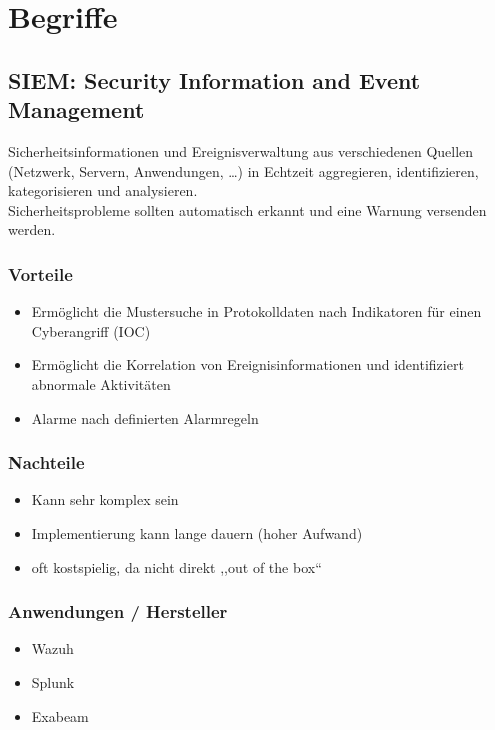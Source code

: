 

\section{Begriffe}\label{sec:Begriffe}

\subsection{SIEM: Security Information and Event Management}\label{subsec:siem}
Sicherheitsinformationen und Ereignisverwaltung aus verschiedenen Quellen (Netzwerk, Servern, Anwendungen, \ldots) in Echtzeit aggregieren, identifizieren, kategorisieren und analysieren.\\
Sicherheitsprobleme sollten automatisch erkannt und eine Warnung versenden werden.
\subsubsection{Vorteile}
\begin{itemize}
    \item Ermöglicht die Mustersuche in Protokolldaten nach Indikatoren für einen Cyberangriff (IOC)
    \item Ermöglicht die Korrelation von Ereignisinformationen und identifiziert abnormale Aktivitäten
    \item Alarme nach definierten Alarmregeln
\end{itemize}

\subsubsection{Nachteile}
\begin{itemize}
    \item Kann sehr komplex sein
    \item Implementierung kann lange dauern (hoher Aufwand)
    \item oft kostspielig, da nicht direkt ,,out of the box``
\end{itemize}

\subsubsection{Anwendungen / Hersteller}
\begin{itemize}
    \item Wazuh
    \item Splunk
    \item Exabeam
\end{itemize}

